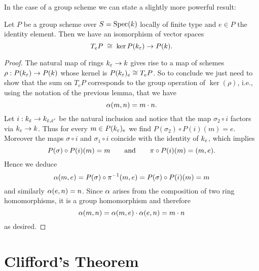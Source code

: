 	In the case of a group scheme we can state a slightly more powerful result:
	\begin{lemm}\label{lemm:tng_grp_sch}
		Let $P$ be a group scheme over $S=\operatorname{Spec}(k)$ locally of finite type and $e\in P$ the identity element. Then we have an isomorphism of vector spaces
		$$ T_e P \;\cong\; \ker P(k_\varepsilon) \to P(k). $$
	\end{lemm}
	\begin{proof}
		The natural map of rings $k_\varepsilon \to k$ gives rise to a map of schemes $\rho: P(k_\varepsilon) \to P(k)$ whose kernel is $P(k_\varepsilon)_e \cong T_e P$. So to conclude we just need to show that the sum on $T_eP$ corresponds to the group operation of $\ker(\rho)$, i.e., using the notation of the previous lemma, that we have
		$$ \alpha(m,n)= m \cdot n. $$
		Let $i:k_\varepsilon \to k_{\varepsilon,\varepsilon'}$ be the natural inclusion and notice that the map $\sigma_2 \circ i$ factors via $k_\varepsilon\to k$. Thus for every $m\in P(k_\varepsilon)_e$ we find $P(\sigma_2)\circ P(i)(m)=e$. Moreover the maps $\sigma\circ i$ and $\sigma_1\circ i$ coincide with the identity of $k_\varepsilon$, which implies
		$$ P(\sigma)\circ P(i)(m)=m \qquad \text{and} \qquad \pi\circ P(i)(m) = (m,e). $$
		Hence we deduce
		$$ \alpha(m,e) = P(\sigma)\circ \pi^{-1}(m,e) = P(\sigma)\circ P(i)(m) = m $$
		and similarly $\alpha(e,n) = n$. Since $\alpha$ arises from the composition of two ring homomorphisms, it is a group homomorphism and therefore
		$$ \alpha(m,n) = \alpha(m,e)\cdot\alpha(e,n) = m\cdot n $$
		as desired.
	\end{proof}

\section{Clifford's Theorem}

